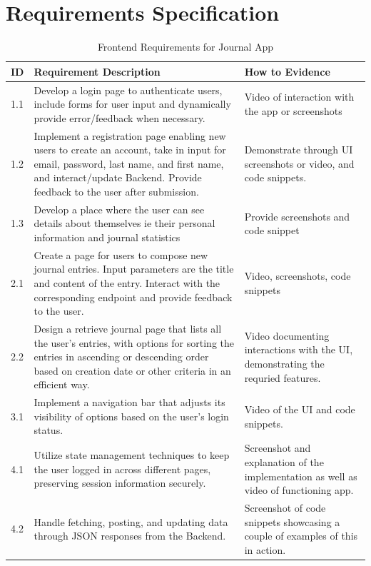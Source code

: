 \section{Requirements Specification}
\begin{table}[H]
\centering
\begin{tabular}{|l|p{8cm}|p{4cm}|}
\hline
\textbf{ID} & \textbf{Requirement Description} & \textbf{How to Evidence}\\ \hline
1.1 & Develop a login page to authenticate users, include forms for user input and dynamically provide error/feedback when necessary. & Video of interaction with the app or screenshots\\ \hline

1.2 & Implement a registration page enabling new users to create an account, take in input for email, password, last name, and first name, and interact/update Backend. Provide feedback to the user after submission. & Demonstrate through UI screenshots or video, and code snippets.\\ \hline

1.3 & Develop a place where the user can see details about themselves ie their personal information and journal statistics & Provide screenshots and code snippet\\ \hline

2.1 & Create a page for users to compose new journal entries. Input parameters are the title and content of the entry. Interact with the corresponding endpoint and provide feedback to the user.& Video, screenshots, code snippets\\ \hline

2.2 & Design a retrieve journal page that lists all the user's entries, with options for sorting the entries in ascending or descending order based on creation date or other criteria in an efficient way. & Video documenting interactions with the UI, demonstrating the requried features.\\ \hline

3.1 & Implement a navigation bar that adjusts its visibility of options based on the user's login status. & Video of the UI and code snippets.\\ \hline

4.1 & Utilize state management techniques to keep the user logged in across different pages, preserving session information securely. & Screenshot and explanation of the implementation as well as video of functioning app.\\ \hline

4.2 & Handle fetching, posting, and updating data through JSON responses from the Backend. & Screenshot of code snippets showcasing a couple of examples of this in action. \\ \hline
\end{tabular}
\caption{Frontend Requirements for Journal App}
\end{table}


